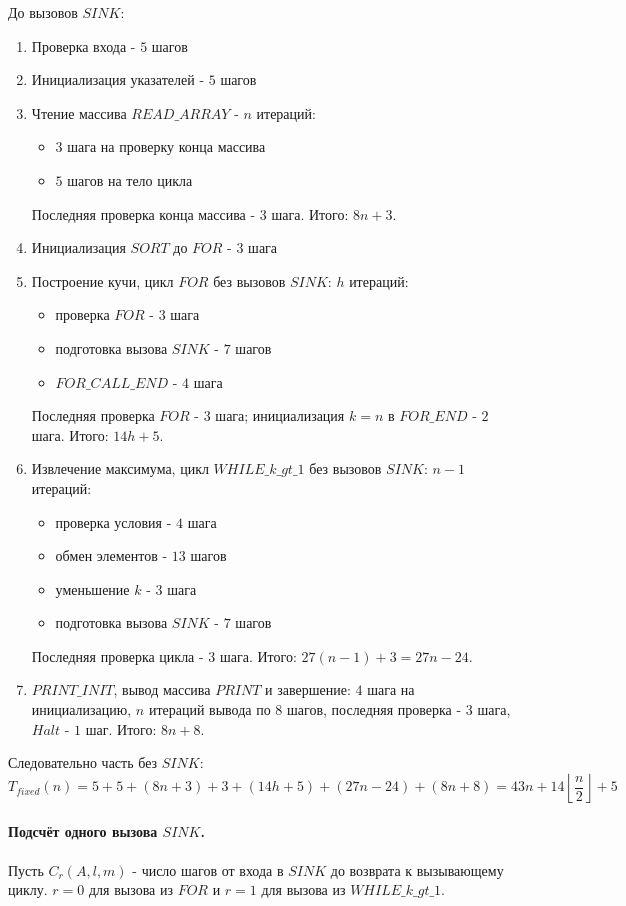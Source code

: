 \documentclass[12pt]{article}
\begin{document}
До вызовов $SINK$:
\begin{enumerate}
    \item Проверка входа - $5$ шагов
    \item Инициализация указателей - $5$ шагов
    \item Чтение массива $READ\_ARRAY$ - $n$ итераций:
    \begin{itemize}
        \item $3$ шага на проверку конца массива
        \item $5$ шагов на тело цикла
    \end{itemize}
    Последняя проверка конца массива - $3$ шага. Итого: $8n+3$.
    \item Инициализация $SORT$ до $FOR$ - $3$ шага
    \item Построение кучи, цикл $FOR$ без вызовов $SINK$: $h$ итераций:
    \begin{itemize}
        \item проверка $FOR$ - $3$ шага
        \item подготовка вызова $SINK$ - $7$ шагов
        \item $FOR\_CALL\_END$ - $4$ шага
    \end{itemize}
    Последняя проверка $FOR$ - $3$ шага; инициализация $k=n$ в $FOR\_END$ - $2$ шага. Итого: $14h+5$.
    \item Извлечение максимума, цикл $WHILE\_k\_gt\_1$ без вызовов $SINK$: $n-1$ итераций:
    \begin{itemize}
        \item проверка условия - $4$ шага
        \item обмен элементов - $13$ шагов
        \item уменьшение $k$ - $3$ шага
        \item подготовка вызова $SINK$ - $7$ шагов
    \end{itemize}
    Последняя проверка цикла - $3$ шага. Итого: $27(n-1)+3=27n-24$.
    \item $PRINT\_INIT$, вывод массива $PRINT$ и завершение:
    $4$ шага на инициализацию, $n$ итераций вывода по $8$ шагов, последняя проверка - $3$ шага, $Halt$ - $1$ шаг. Итого: $8n+8$.
\end{enumerate}

Следовательно часть без $SINK$:
\[
T_{fixed}(n)
=5+5+(8n+3)+3+(14h+5)+(27n-24)+(8n+8)
=43n+14\left\lfloor\frac n2\right\rfloor+5
\]

\paragraph{Подсчёт одного вызова $SINK$.}
Пусть $C_r(A,l,m)$ - число шагов от входа в $SINK$ до возврата к вызывающему циклу. $r=0$ для вызова из $FOR$ и $r=1$ для вызова из $WHILE\_k\_gt\_1$.
\end{document}
